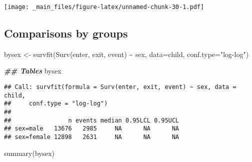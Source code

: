 \documentclass[
]{book}
\newenvironment{Shaded}{\begin{snugshade}}{\end{snugshade}}
\newcommand{\AttributeTok}[1]{\textcolor[rgb]{0.77,0.63,0.00}{#1}}
\newcommand{\DocumentationTok}[1]{\textcolor[rgb]{0.56,0.35,0.01}{\textbf{\textit{#1}}}}
\newcommand{\FunctionTok}[1]{\textcolor[rgb]{0.00,0.00,0.00}{#1}}
\newcommand{\NormalTok}[1]{#1}
\newcommand{\OtherTok}[1]{\textcolor[rgb]{0.56,0.35,0.01}{#1}}
\newcommand{\SpecialCharTok}[1]{\textcolor[rgb]{0.00,0.00,0.00}{#1}}
\newcommand{\StringTok}[1]{\textcolor[rgb]{0.31,0.60,0.02}{#1}}
\begin{document}
\texttt{[image: \_main\_files/figure-latex/unnamed-chunk-30-1.pdf]}

\hypertarget{comparisons-by-groups}{%
\subsection{Comparisons by groups}\label{comparisons-by-groups}}

\begin{Shaded}
\begin{Highlighting}[]
\NormalTok{bysex }\OtherTok{\textless{}{-}} \FunctionTok{survfit}\NormalTok{(}\FunctionTok{Surv}\NormalTok{(enter, exit, event) }\SpecialCharTok{\textasciitilde{}}\NormalTok{ sex,}
                    \AttributeTok{data=}\NormalTok{child,}
                    \AttributeTok{conf.type=}\StringTok{"log{-}log"}\NormalTok{)}

\DocumentationTok{\#\# Tables}
\NormalTok{bysex}
\end{Highlighting}
\end{Shaded}

\begin{verbatim}
## Call: survfit(formula = Surv(enter, exit, event) ~ sex, data = child, 
##     conf.type = "log-log")
## 
##                n events median 0.95LCL 0.95UCL
## sex=male   13676   2985     NA      NA      NA
## sex=female 12898   2631     NA      NA      NA
\end{verbatim}

\begin{Shaded}
\begin{Highlighting}[]
\FunctionTok{summary}\NormalTok{(bysex)}
\end{Highlighting}
\end{Shaded}
\end{document}
